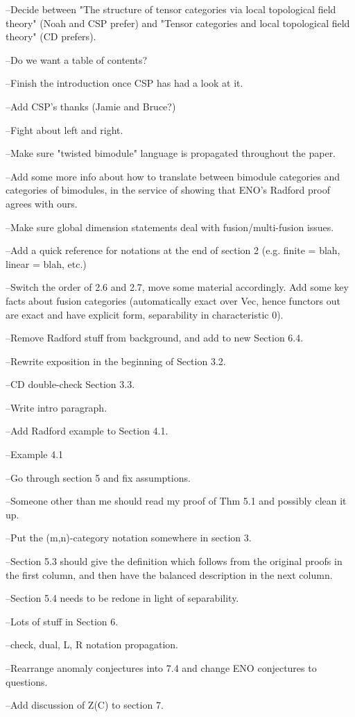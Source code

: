 --Decide between "The structure of tensor categories via local topological field theory" (Noah and CSP prefer) and "Tensor categories and local topological field theory" (CD prefers).

--Do we want a table of contents?

--Finish the introduction once CSP has had a look at it.

--Add CSP's thanks (Jamie and Bruce?)

--Fight about left and right.

--Make sure "twisted bimodule" language is propagated throughout the paper.

--Add some more info about how to translate between bimodule categories and categories of bimodules, in the service of showing that ENO's Radford proof agrees with ours.

--Make sure global dimension statements deal with fusion/multi-fusion issues.

--Add a quick reference for notations at the end of section 2 (e.g. finite = blah, linear = blah, etc.)

--Switch the order of 2.6 and 2.7, move some material accordingly.  Add some key facts about fusion categories (automatically exact over Vec, hence functors out are exact and have explicit form, separability in characteristic 0).

--Remove Radford stuff from background, and add to new Section 6.4.

--Rewrite exposition in the beginning of Section 3.2.

--CD double-check Section 3.3.

--Write intro paragraph.

--Add Radford example to Section 4.1.

--Example 4.1

--Go through section 5 and fix assumptions.

--Someone other than me should read my proof of Thm 5.1 and possibly clean it up.

--Put the (m,n)-category notation somewhere in section 3.

--Section 5.3 should give the definition which follows from the original proofs in the first column, and then have the balanced description in the next column.

--Section 5.4 needs to be redone in light of separability.

--Lots of stuff in Section 6.

--check, dual, L, R notation propagation.

--Rearrange anomaly conjectures into 7.4 and change ENO conjectures to questions.

--Add discussion of Z(C) to section 7.